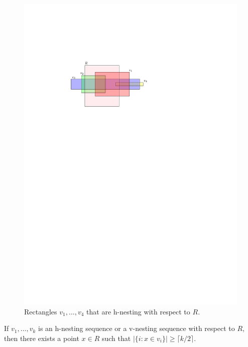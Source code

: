 \documentclass[lotsofwhite]{patmorin}
\begin{document}
\begin{figure}
 \begin{center}
    \includegraphics{figs/nesting}
 \end{center}
 \caption{Rectangles $v_1,\ldots,v_4$ that are h-nesting with respect to $R$.}
\end{figure}

\begin{lem}
   If $v_1,\ldots,v_k$ is an h-nesting sequence or a v-nesting sequence
   with respect to $R$, then there exists a point $x\in R$ such that 
   $|\{ i: x\in v_i \}|\ge \lceil k/2\rceil$.
\end{lem}
\end{document}
